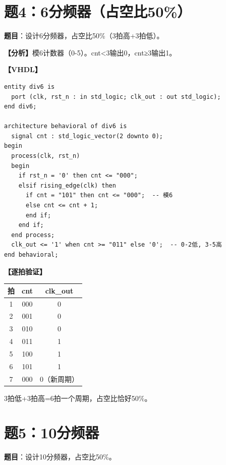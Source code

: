 \section{题4：6分频器（占空比50\%）}

\textbf{题目}：设计6分频器，占空比50\%（3拍高+3拍低）。

\begin{solution}[完整解答]

\textbf{【分析】}模6计数器（0-5）。cnt<3输出0，cnt≥3输出1。

\textbf{【VHDL】}
\begin{lstlisting}
entity div6 is
  port (clk, rst_n : in std_logic; clk_out : out std_logic);
end div6;

architecture behavioral of div6 is
  signal cnt : std_logic_vector(2 downto 0);
begin
  process(clk, rst_n)
  begin
    if rst_n = '0' then cnt <= "000";
    elsif rising_edge(clk) then
      if cnt = "101" then cnt <= "000";  -- 模6
      else cnt <= cnt + 1;
      end if;
    end if;
  end process;
  clk_out <= '1' when cnt >= "011" else '0';  -- 0-2低, 3-5高
end behavioral;
\end{lstlisting}

\textbf{【逐拍验证】}
\begin{center}
\begin{tabular}{|c|c|c|}\hline
拍 & cnt & clk\_out \\ \hline
1 & 000 & 0 \\ \hline 2 & 001 & 0 \\ \hline
3 & 010 & 0 \\ \hline 4 & 011 & 1 \\ \hline
5 & 100 & 1 \\ \hline 6 & 101 & 1 \\ \hline
7 & 000 & 0（新周期）\\ \hline
\end{tabular}
\end{center}
3拍低+3拍高=6拍一个周期，占空比恰好50\%。

\end{solution}


\section{题5：10分频器}

\textbf{题目}：设计10分频器，占空比50\%。

